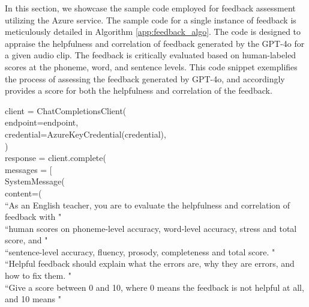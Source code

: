 \documentclass{Interspeech}
\begin{document}
In this section, we showcase the sample code employed for feedback assessment utilizing the Azure service. The sample code for a single instance of feedback is meticulously detailed in Algorithm \ref{app:feedback_algo}. The code is designed to appraise the helpfulness and correlation of feedback generated by the GPT-4o for a given audio clip. The feedback is critically evaluated based on human-labeled scores at the phoneme, word, and sentence levels. This code snippet exemplifies the process of assessing the feedback generated by GPT-4o, and accordingly provides a score for both the helpfulness and correlation of the feedback.

\begin{algorithm}
  \caption{Feedback Assessment with Azure service.}
  \label{app:feedback_algo}
  \begin{algorithmic}[1]
    \STATE client = ChatCompletionsClient( \\
    \STATE \hspace{5mm} endpoint=endpoint, \\
    \STATE \hspace{5mm} credential=AzureKeyCredential(credential), \\
    \STATE ) \\
    \STATE response = client.complete( \\
    \STATE \hspace{5mm} messages = [ \\
    \STATE \hspace{10mm} SystemMessage( \\
    \STATE \hspace{15mm} content=( \\
    \STATE \hspace{20mm} ``As an English teacher, you are to evaluate the helpfulness and correlation of feedback with " \\
    \STATE \hspace{20mm} ``human scores on phoneme-level accuracy, word-level accuracy, stress and total score, and " \\
    \STATE \hspace{20mm} ``sentence-level accuracy, fluency, prosody, completeness and total score. " \\
    \STATE \hspace{20mm} ``Helpful feedback should explain what the errors are, why they are errors, and how to fix them. " \\
    \STATE \hspace{20mm} ``Give a score between 0 and 10, where 0 means the feedback is not helpful at all, and 10 means " \\

\end{algorithmic}
\end{algorithm}
\end{document}
